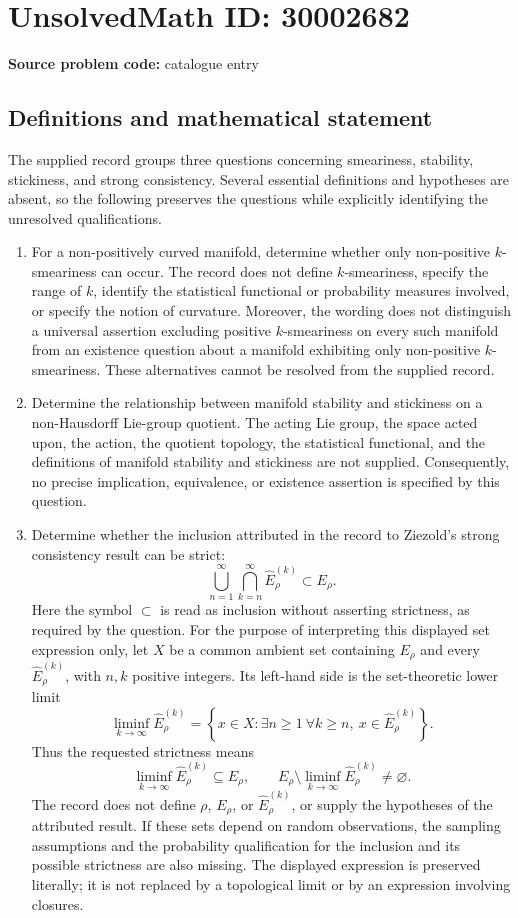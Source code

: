 \documentclass[11pt]{article}
\begin{document}
\section*{UnsolvedMath ID: 30002682}
\textbf{Source problem code:} catalogue entry
\subsection{Definitions and mathematical statement}
The supplied record groups three questions concerning smeariness, stability, stickiness, and strong consistency. Several essential definitions and hypotheses are absent, so the following preserves the questions while explicitly identifying the unresolved qualifications.

\begin{enumerate}
\item For a non-positively curved manifold, determine whether only non-positive \(k\)-smeariness can occur. The record does not define \(k\)-smeariness, specify the range of \(k\), identify the statistical functional or probability measures involved, or specify the notion of curvature. Moreover, the wording does not distinguish a universal assertion excluding positive \(k\)-smeariness on every such manifold from an existence question about a manifold exhibiting only non-positive \(k\)-smeariness. These alternatives cannot be resolved from the supplied record.
\item Determine the relationship between manifold stability and stickiness on a non-Hausdorff Lie-group quotient. The acting Lie group, the space acted upon, the action, the quotient topology, the statistical functional, and the definitions of manifold stability and stickiness are not supplied. Consequently, no precise implication, equivalence, or existence assertion is specified by this question.
\item Determine whether the inclusion attributed in the record to Ziezold's strong consistency result can be strict:
\[
\bigcup_{n=1}^{\infty}\bigcap_{k=n}^{\infty}\widehat E_\rho^{(k)}\subset E_\rho.
\]
Here the symbol \(\subset\) is read as inclusion without asserting strictness, as required by the question. For the purpose of interpreting this displayed set expression only, let \(X\) be a common ambient set containing \(E_\rho\) and every \(\widehat E_\rho^{(k)}\), with \(n,k\) positive integers. Its left-hand side is the set-theoretic lower limit
\[
\liminf_{k\to\infty}\widehat E_\rho^{(k)}
=\left\{x\in X:\exists n\geq 1\ \forall k\geq n,\ x\in\widehat E_\rho^{(k)}\right\}.
\]
Thus the requested strictness means
\[
\liminf_{k\to\infty}\widehat E_\rho^{(k)}\subseteq E_\rho,
\qquad
E_\rho\setminus\liminf_{k\to\infty}\widehat E_\rho^{(k)}\neq\varnothing.
\]
The record does not define \(\rho\), \(E_\rho\), or \(\widehat E_\rho^{(k)}\), or supply the hypotheses of the attributed result. If these sets depend on random observations, the sampling assumptions and the probability qualification for the inclusion and its possible strictness are also missing. The displayed expression is preserved literally; it is not replaced by a topological limit or by an expression involving closures.
\end{enumerate}
\end{document}
